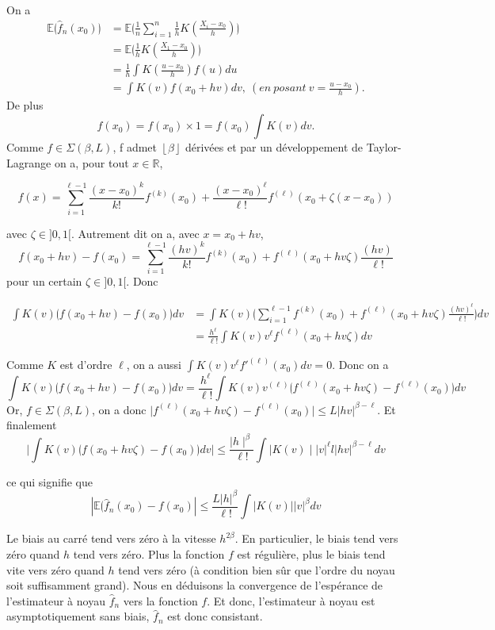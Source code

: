 \documentclass[
]{book}
\begin{document}
\begin{demo} On a
$$
\begin{aligned}
\mathbb E\lgroup \hat f_n(x_0) \rgroup&=\mathbb E\lgroup\frac{1}{n}\sum_{i=1}^n \frac{1}{h}K(\frac{X_i-x_0}{h})\rgroup \\
&=\mathbb E\lgroup \frac{1}{h}K(\frac{X_1-x_0}{h})\rgroup \\
&=\frac{1}{h}\int K(\frac{u-x_0}{h})f(u)du  \\
&=\int K(v)f(x_0+hv)dv,\  (en\ posant\ v=\frac{u-x_0}{h}).
\end{aligned}
$$
De plus
$$
f(x_0)=f(x_0)\times 1 = f(x_0) \int K(v)dv.
$$
Comme $f \in \Sigma(\beta, L)$, f admet $\left\lfloor{\beta} \right \rfloor$ dérivées et par un développement de Taylor-Lagrange on a, pour tout $x \in \mathbb R$,

$$
f(x)= \sum_{i=1}^{\ell-1}\frac{(x-x_0)^k}{k!}f^{(k)}(x_0)+\frac{(x-x_0)^\ell}{\ell!}f^{(\ell)}(x_0+\zeta (x-x_0))
$$  

avec $\zeta \in ]0,1[$. Autrement dit on a, avec $x= x_0+hv$,
$$
f(x_0+hv)-f(x_0)=\sum_{i=1}^{\ell-1}\frac{(hv)^k}{k!}f^{(k)}(x_0)+f^{(\ell)}(x_0+hv\zeta)\frac{(hv)}{\ell !}
$$  
pour un certain $\zeta \in ]0,1[$. Donc

$$
\begin{aligned}
\int K(v)\lgroup f(x_0+hv)-f(x_0)\rgroup dv &= \int K(v)\lgroup\sum_{i=1}^{\ell - 1}f^{(k)}(x_0)+f^{(\ell)}(x_0+hv\zeta)\frac{(hv)^{\ell}}{\ell !}\rgroup dv \\
&=\frac{h^{\ell}}{\ell !}\int K(v)v^{\ell}f^{(\ell)}(x_0+hv\zeta)dv
\end{aligned}
$$

Comme $K$ est d'ordre $\ell$, on a aussi $\int K(v)v^{\ell}f'^(\ell)(x_0)dv=0$. Donc on a
$$
\int K(v)\lgroup f(x_0+hv)-f(x_0)\rgroup dv = \frac{h^{\ell}}{\ell !}\int K(v)v^{(\ell)}\lgroup f^{(\ell)}(x_0 + hv\zeta)-f^{(\ell)}(x_0)\rgroup dv
$$
Or, $f \in \Sigma(\beta, L)$, on a donc $\mid f^{(\ell)}(x_0+hv\zeta)-f^{(\ell)}(x_0)\mid \leq L|hv|^{\beta-\ell}$. Et finalement
$$
\mid \int K(v)\lgroup f(x_0+hv\zeta)-f(x_0)\rgroup dv \mid \leq \frac{\mid h\mid^{\beta}}{\ell !}\int \mid K(v) \mid |v|^{\ell}l|hv|^{\beta-\ell}dv
$$

ce qui signifie que
$$
|\mathbb E \lgroup\hat f_n(x_0)-f(x_0)| \leq \frac{L|h|^{\beta}}{\ell !}\int |K(v)||v|^{\beta}dv
$$
\end{demo}
\begin{corol}   Le biais au carré tend vers zéro à la vitesse $h^{2\beta}$. En particulier, le biais tend vers zéro quand $h$ tend vers zéro. Plus la fonction $f$ est régulière, plus le biais tend vite vers zéro quand $h$ tend vers zéro (à condition bien sûr que l'ordre du noyau soit suffisamment grand). Nous en déduisons la convergence de l'espérance de l'estimateur à noyau $\hat {f}_n$ vers la fonction $f$. Et donc, l'estimateur à noyau est asymptotiquement sans biais, $\hat {f}_n$ est donc consistant.\newline
 \end{corol}
\end{document}
